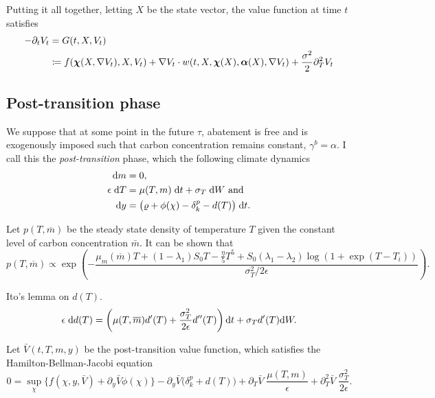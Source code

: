 \documentclass[../../main.tex]{subfiles}
\begin{document}
Putting it all together, letting $X$ be the state vector, the value function at time $t$ satisfies \begin{equation}
    \begin{split}
        -\partial_t V_t &= G(t, X, V_t) \\
        &\coloneqq f(\bm{\chi}(X, \nabla V_t), X, V_t) + \nabla V_t \cdot w(t, X, \bm{\chi}(X), \bm{\alpha}(X),  \nabla V_t) + \frac{\sigma^2}{2} \partial_{T}^2 V_t
    \end{split}
\end{equation}


\subsection{Post-transition phase}

We suppose that at some point in the future $\tau$, abatement is free and is exogenously imposed such that carbon concentration remains constant, $\gamma^b = \alpha$. I call this the \textit{post-transition} phase, which the following climate dynamics \begin{align}
    \mathrm{d}m &= 0, \\
    \epsilon \; \mathrm{d}T &= \mu(T, m) \; \mathrm{d}t + \sigma_T \; \mathrm{d}W \text{ and } \\
    \mathrm{d}y &= \big( \varrho + \phi(\chi) - \delta_k^p - d(T) \big) \; \mathrm{d}t.
\end{align}

Let $p(T, \overline{m})$ be the steady state density of temperature $T$ given the constant level of carbon concentration $\bar{m}$. It can be shown that \begin{equation}
    p(T, \overline{m}) \propto \exp\left(-\frac{\mu_m(\overline{m}) T + (1 - \lambda_1) S_0 T - \frac{\eta}{5} T^5 + S_0 (\lambda_1 - \lambda_2) \log(1 + \exp(T - T_i))}{\sigma_T^2 / 2\epsilon}\right).
\end{equation}

Ito's lemma on $d(T)$.
\begin{equation}
    \epsilon \; \mathrm{d}d(T) = \left(\mu(T, \overline{m}) d'(T) + \frac{\sigma^2_T}{2\epsilon} d''(T) \right) \mathrm{d}t + \sigma_T d'(T) \mathrm{d}W.
\end{equation}

\newpage

Let $\bar{V}(t, T, m, y)$ be the post-transition value function, which satisfies the Hamilton-Bellman-Jacobi equation \begin{equation}
    0 = \sup_{\chi} \Big\{f(\chi, y, \bar{V}) +  \partial_y \bar{V} \phi(\chi) \Big\} - \partial_y \bar{V} \Big(\delta^{p}_k + d(T)\Big) + \partial_T \bar{V} \; \frac{\mu(T, m)}{\epsilon}+ \partial^2_T \bar{V} \; \frac{\sigma^2_T}{2\epsilon}.
\end{equation}
\end{document}
